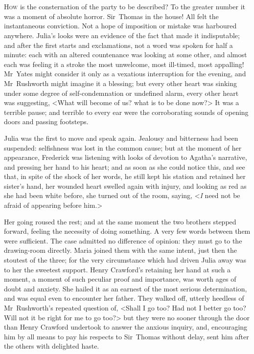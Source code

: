 \chapter[Chapter \thechapter]{} 

 \lettrine[lraise=0.3]{H}{ow} is the consternation of the party to be described? To the greater number it was a moment of absolute horror. Sir~Thomas in the house! All felt the instantaneous conviction. Not a hope of imposition or mistake was harboured anywhere. Julia's looks were an evidence of the fact that made it indisputable; and after the first starts and exclamations, not a word was spoken for half a minute: each with an altered countenance was looking at some other, and almost each was feeling it a stroke the most unwelcome, most ill-timed, most appalling! Mr~Yates might consider it only as a vexatious interruption for the evening, and Mr~Rushworth might imagine it a blessing; but every other heart was sinking under some degree of self-condemnation or undefined alarm, every other heart was suggesting, <What will become of us? what is to be done now?> It was a terrible pause; and terrible to every ear were the corroborating sounds of opening doors and passing footsteps.

Julia was the first to move and speak again. Jealousy and bitterness had been suspended: selfishness was lost in the common cause; but at the moment of her appearance, Frederick was listening with looks of devotion to Agatha's narrative, and pressing her hand to his heart; and as soon as she could notice this, and see that, in spite of the shock of her words, he still kept his station and retained her sister's hand, her wounded heart swelled again with injury, and looking as red as she had been white before, she turned out of the room, saying, <\textit{I}  need not be afraid of appearing before him.>

Her going roused the rest; and at the same moment the two brothers stepped forward, feeling the necessity of doing something. A very few words between them were sufficient. The case admitted no difference of opinion: they must go to the drawing-room directly. Maria joined them with the same intent, just then the stoutest of the three; for the very circumstance which had driven Julia away was to her the sweetest support. Henry Crawford's retaining her hand at such a moment, a moment of such peculiar proof and importance, was worth ages of doubt and anxiety. She hailed it as an earnest of the most serious determination, and was equal even to encounter her father. They walked off, utterly heedless of Mr~Rushworth's repeated question of, <Shall I go too? Had not I better go too? Will not it be right for me to go too?> but they were no sooner through the door than Henry Crawford undertook to answer the anxious inquiry, and, encouraging him by all means to pay his respects to Sir~Thomas without delay, sent him after the others with delighted haste.

